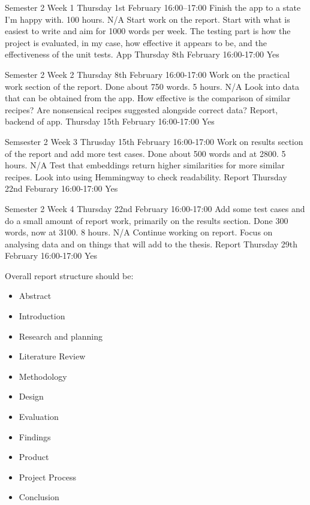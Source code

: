 \documentclass[../CHEFCookingHelper.tex]{subfiles}
\begin{document}
\logbookentry
{Semester 2 Week 1}
{Thursday 1st February 16:00--17:00}
{Finish the app to a state I'm happy with.}
{100 hours.}
{N/A}
{Start work on the report. Start with what is easiest to write and aim for 1000 words
per week. The testing part is how the project is evaluated, in my case, how effective
it appears to be, and the effectiveness of the unit tests.}
{App}
{Thursday 8th February 16:00-17:00}
{Yes}

\logbookentry
{Semester 2 Week 2}
{Thursday 8th February 16:00-17:00}
{Work on the practical work section of the report. Done about 750 words.}
{5 hours.}
{N/A}
{Look into data that can be obtained from the app. How effective is the
comparison of similar recipes? Are nonsensical recipes suggested alongside
correct data?}
{Report, backend of app.}
{Thursday 15th February 16:00-17:00}
{Yes}

\logbookentry
{Semsester 2 Week 3}
{Thrusday 15th February 16:00-17:00}
{Work on results section of the report and add more test cases. Done about 500 words and at 2800.}
{5 hours.}
{N/A}
{Test that embeddings return higher similarities for more similar recipes.
Look into using Hemmingway to check readability.}
{Report}
{Thursday 22nd Feburary  16:00-17:00}
{Yes}

\logbookentry
{Semester 2 Week 4}
{Thursday 22nd February 16:00-17:00}
{Add some test cases and do a small amount of report work, primarily on the results
section. Done 300 words, now at 3100.}
{8 hours.}
{N/A}
{Continue working on report. Focus on analysing data and on things that will add to the thesis.}
{Report}
{Thursday 29th February 16:00-17:00}
{Yes}

Overall report structure should be:
\begin{itemize}
    \item Abstract
    \item Introduction
    \item Research and planning
    \item Literature Review
    \item Methodology
    \item Design
    \item Evaluation
    \item Findings
    \item Product
    \item Project Process
    \item Conclusion
\end{itemize}
\end{document}
